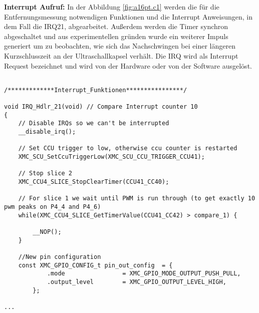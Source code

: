 \textbf{Interrupt Aufruf:}
In der Abbildung \ref{fig:a16pt.c1} werden die für die Entfernungsmessung notwendigen Funktionen und die Interrupt Anweisungen, in dem Fall die IRQ21, abgearbeitet. Außerdem werden die Timer synchron abgeschaltet und aus experimentellen gründen wurde ein weiterer Impuls generiert um zu beobachten, wie sich das Nachschwingen bei einer längeren Kurzschlusszeit an der Ultraschallkapsel verhält. Die IRQ wird als Interrupt Request bezeichnet und wird von der Hardware oder von der Software ausgelöst.
\\
\begin{minipage}{1\textwidth}
\begin{lstlisting}

/*************Interrupt_Funktionen****************/

void IRQ_Hdlr_21(void) // Compare Interrupt counter 10
{
	// Disable IRQs so we can't be interrupted
	__disable_irq();

	// Set CCU trigger to low, otherwise ccu counter is restarted
	XMC_SCU_SetCcuTriggerLow(XMC_SCU_CCU_TRIGGER_CCU41);

	// Stop slice 2
	XMC_CCU4_SLICE_StopClearTimer(CCU41_CC40);

	// For slice 1 we wait until PWM is run through (to get exactly 10 pwm peaks on P4_4 and P4_6)
	while(XMC_CCU4_SLICE_GetTimerValue(CCU41_CC42) > compare_1) {

		__NOP();
	}
	
	//New pin configuration
	const XMC_GPIO_CONFIG_t pin_out_config	= {
			.mode                = XMC_GPIO_MODE_OUTPUT_PUSH_PULL,
			.output_level        = XMC_GPIO_OUTPUT_LEVEL_HIGH,
		};

...
\end{lstlisting}
\label{fig:a16pt.c1}
\end{minipage}
